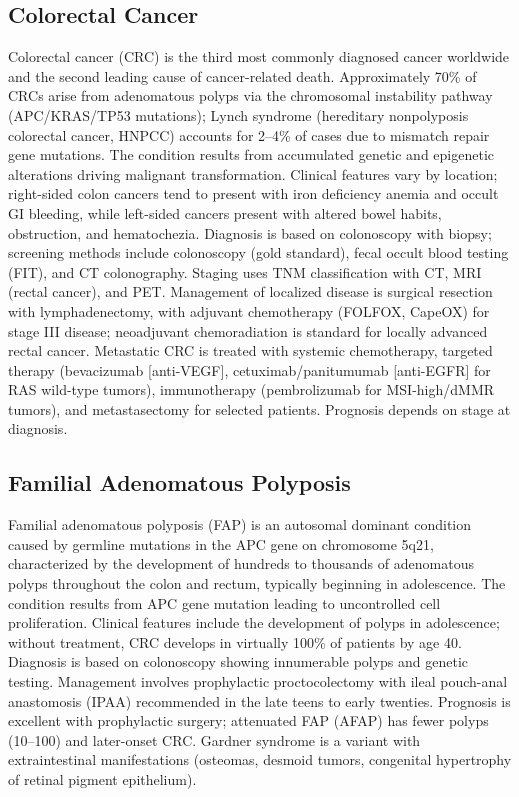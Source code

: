 \subsection{Colorectal Cancer}
\label{sec:Colorectal Cancer}
Colorectal cancer (CRC) is the third most commonly diagnosed cancer worldwide and the second leading cause of cancer-related death. Approximately 70\% of CRCs arise from adenomatous polyps via the chromosomal instability pathway (APC/KRAS/TP53 mutations); Lynch syndrome (hereditary nonpolyposis colorectal cancer, HNPCC) accounts for 2--4\% of cases due to mismatch repair gene mutations. The condition results from accumulated genetic and epigenetic alterations driving malignant transformation. Clinical features vary by location; right-sided colon cancers tend to present with iron deficiency anemia and occult GI bleeding, while left-sided cancers present with altered bowel habits, obstruction, and hematochezia. Diagnosis is based on colonoscopy with biopsy; screening methods include colonoscopy (gold standard), fecal occult blood testing (FIT), and CT colonography. Staging uses TNM classification with CT, MRI (rectal cancer), and PET. Management of localized disease is surgical resection with lymphadenectomy, with adjuvant chemotherapy (FOLFOX, CapeOX) for stage III disease; neoadjuvant chemoradiation is standard for locally advanced rectal cancer. Metastatic CRC is treated with systemic chemotherapy, targeted therapy (bevacizumab [anti-VEGF], cetuximab/panitumumab [anti-EGFR] for RAS wild-type tumors), immunotherapy (pembrolizumab for MSI-high/dMMR tumors), and metastasectomy for selected patients. Prognosis depends on stage at diagnosis.

\subsection{Familial Adenomatous Polyposis}
\label{sec:Familial Adenomatous Polyposis}
Familial adenomatous polyposis (FAP) is an autosomal dominant condition caused by germline mutations in the APC gene on chromosome 5q21, characterized by the development of hundreds to thousands of adenomatous polyps throughout the colon and rectum, typically beginning in adolescence. The condition results from APC gene mutation leading to uncontrolled cell proliferation. Clinical features include the development of polyps in adolescence; without treatment, CRC develops in virtually 100\% of patients by age 40. Diagnosis is based on colonoscopy showing innumerable polyps and genetic testing. Management involves prophylactic proctocolectomy with ileal pouch-anal anastomosis (IPAA) recommended in the late teens to early twenties. Prognosis is excellent with prophylactic surgery; attenuated FAP (AFAP) has fewer polyps (10--100) and later-onset CRC. Gardner syndrome is a variant with extraintestinal manifestations (osteomas, desmoid tumors, congenital hypertrophy of retinal pigment epithelium).

